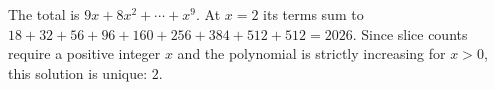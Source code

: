 The total is $9x+8x^2+\cdots+x^9$. At $x=2$ its terms sum to $18+32+56+96+160+256+384+512+512=2026$. Since slice counts require a positive integer $x$ and the polynomial is strictly increasing for $x>0$, this solution is unique: $\boxed2$.
